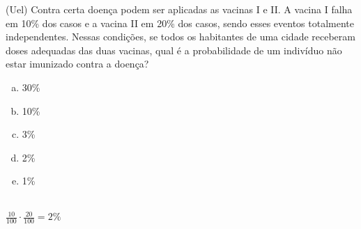 \begin{ex}
(Uel) Contra certa doença podem ser aplicadas as vacinas I e II. A vacina I falha em 10\% dos casos e a vacina II em 20\% dos casos, sendo esses eventos totalmente independentes. Nessas condições, se todos os habitantes de uma cidade receberam doses adequadas das duas vacinas, qual é a probabilidade de um indivíduo não estar imunizado contra a doença?
   \begin{enumerate}[(a)]
   \item 30\%
   \item 10\%
   \item 3\%
   \item 2\%
   \item 1\%
   \end{enumerate}
     \begin{sol}
      \phantom{A} \\
      $\frac{10}{100}\cdot\frac{20}{100}=2\%$
     \end{sol}
\end{ex}